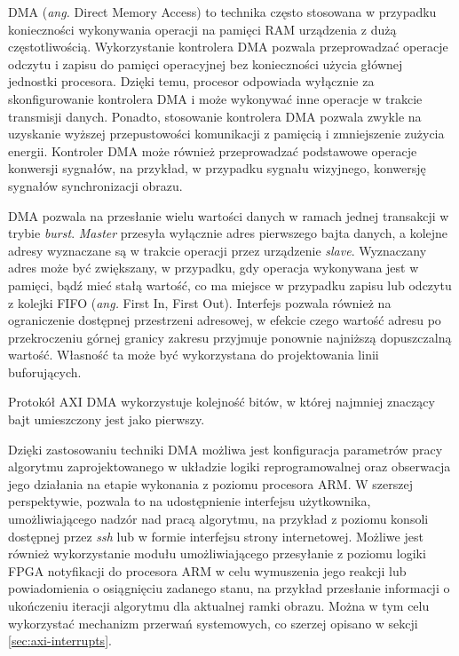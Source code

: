 DMA (\emph{ang.} Direct Memory Access) to technika często stosowana w przypadku konieczności wykonywania operacji na pamięci RAM urządzenia z dużą częstotliwością. %
Wykorzystanie kontrolera DMA pozwala przeprowadzać operacje odczytu i zapisu do pamięci operacyjnej bez konieczności użycia głównej jednostki procesora. 
Dzięki temu, procesor odpowiada wyłącznie za skonfigurowanie kontrolera DMA i może wykonywać inne operacje w trakcie transmisji danych. 
Ponadto, stosowanie kontrolera DMA pozwala zwykle na uzyskanie wyższej przepustowości komunikacji z pamięcią i zmniejszenie zużycia energii.
Kontroler DMA może również przeprowadzać podstawowe operacje konwersji sygnałów, na przykład, w przypadku sygnału wizyjnego, konwersję sygnałów synchronizacji obrazu. %

DMA pozwala na przesłanie wielu wartości danych w ramach jednej transakcji w trybie \emph{burst}. 
\emph{Master} przesyła wyłącznie adres pierwszego bajta danych, a kolejne adresy wyznaczane są w trakcie operacji przez urządzenie \emph{slave}.
Wyznaczany adres może być zwiększany, w przypadku, gdy operacja wykonywana jest w pamięci, bądź mieć stałą wartość, co ma miejsce w przypadku zapisu lub odczytu z kolejki FIFO (\emph{ang.} First In, First Out). 
Interfejs pozwala również na ograniczenie dostępnej przestrzeni adresowej, w efekcie czego wartość adresu po przekroczeniu górnej granicy zakresu przyjmuje ponownie najniższą dopuszczalną wartość. 
Własność ta może być wykorzystana do projektowania linii buforujących.

Protokół AXI DMA wykorzystuje kolejność bitów, w której najmniej znaczący bajt umieszczony jest jako pierwszy. %

Dzięki zastosowaniu techniki DMA możliwa jest konfiguracja parametrów pracy algorytmu zaprojektowanego w układzie logiki reprogramowalnej oraz obserwacja jego działania na etapie wykonania z poziomu procesora ARM. %
W szerszej perspektywie, pozwala to na udostępnienie interfejsu użytkownika, umożliwiającego nadzór nad pracą algorytmu, na przykład z poziomu konsoli dostępnej przez \emph{ssh} lub w formie interfejsu strony internetowej. 
Możliwe jest również wykorzystanie modułu umożliwiającego przesyłanie z poziomu logiki FPGA notyfikacji do procesora ARM w celu wymuszenia jego reakcji lub powiadomienia o osiągnięciu zadanego stanu, na przykład przesłanie informacji o ukończeniu iteracji algorytmu dla aktualnej ramki obrazu. %
Można w tym celu wykorzystać mechanizm przerwań systemowych, co szerzej opisano w sekcji \ref{sec:axi-interrupts}.

